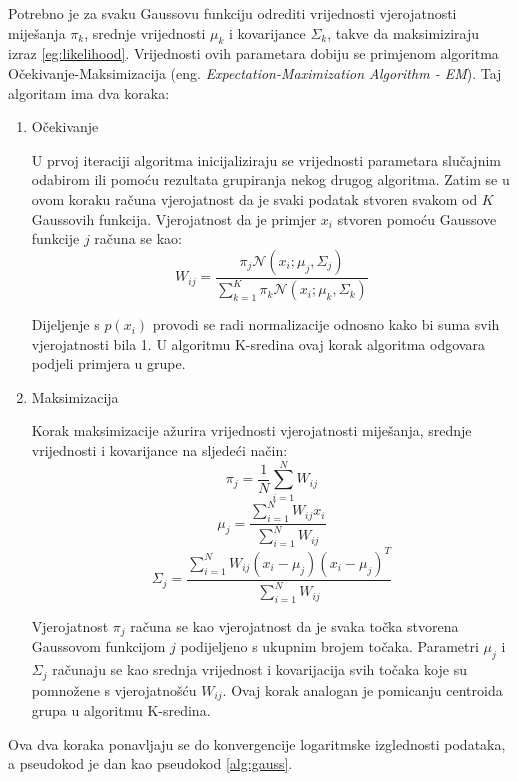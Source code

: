 \documentclass[utf8, diplomski, numeric]{fer}
\begin{document}
Potrebno je za svaku Gaussovu funkciju odrediti vrijednosti vjerojatnosti miješanja $\pi_k$, srednje vrijednosti $\mu_k$ i kovarijance $\Sigma_k$, takve da maksimiziraju izraz \ref{eg:likelihood}. Vrijednosti ovih parametara dobiju se primjenom algoritma Očekivanje-Maksimizacija (eng. \textit{Expectation-Maximization Algorithm - EM}). Taj algoritam ima dva koraka:
\begin{enumerate}
\item Očekivanje

U prvoj iteraciji algoritma inicijaliziraju se vrijednosti parametara slučajnim odabirom ili pomoću rezultata grupiranja nekog drugog algoritma. Zatim se u ovom koraku računa vjerojatnost da je svaki podatak stvoren svakom od $K$ Gaussovih funkcija. Vjerojatnost da je primjer $x_i$ stvoren pomoću Gaussove funkcije $j$ računa se kao:
\begin{equation}\label{eq:expectation}
W_{ij} = \frac{\pi_j \mathcal{N}(x_i;\mu_j,\Sigma_j)}{\sum_{k=1}^{K} \pi_k \mathcal{N}(x_i;\mu_k,\Sigma_k)}
\end{equation}

Dijeljenje s $p(x_i)$ provodi se radi normalizacije odnosno kako bi suma svih vjerojatnosti bila 1. U algoritmu K-sredina ovaj korak algoritma odgovara podjeli primjera u grupe.
\item Maksimizacija

Korak maksimizacije ažurira vrijednosti vjerojatnosti miješanja, srednje vrijednosti i kovarijance na sljedeći način:
\begin{equation}\label{eq:max}
\pi_j = \frac{1}{N}\sum_{i=1}^{N} W_{ij}
\end{equation}
\begin{equation}\label{eq:max}
\mu_j = \frac{\sum_{i=1}^{N} W_{ij}x_i}{\sum_{i=1}^{N} W_{ij}}
\end{equation}
\begin{equation}\label{eq:max}
\Sigma_j = \frac{\sum_{i=1}^{N} W_{ij}(x_i-\mu_j)(x_i-\mu_j)^T}{\sum_{i=1}^{N} W_{ij}}
\end{equation}

Vjerojatnost $\pi_j$ računa se kao vjerojatnost da je svaka točka stvorena Gaussovom funkcijom $j$ podijeljeno s ukupnim brojem točaka. Parametri $\mu_j$ i $\Sigma_j$ računaju se kao srednja vrijednost i kovarijacija svih točaka koje su pomnožene s vjerojatnošću $W_{ij}$. Ovaj korak analogan je pomicanju centroida grupa u algoritmu K-sredina.
\end{enumerate}

Ova dva koraka ponavljaju se do konvergencije logaritmske izglednosti podataka, a pseudokod je dan kao pseudokod \ref{alg:gauss}. 
\end{document}
